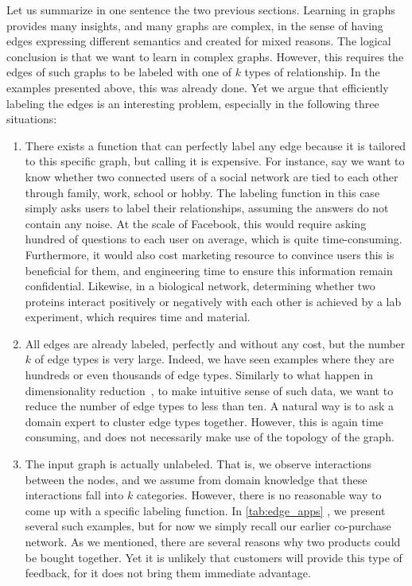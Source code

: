 Let us summarize in one sentence the two previous sections. Learning in graphs provides many
insights, and many graphs are complex, in the sense of having edges expressing different semantics
and created for mixed reasons. The logical conclusion is that we want to learn in complex graphs.
However, this requires the edges of such graphs to be labeled with one of $k$ types of relationship.
In the examples presented above, this was already done. Yet we argue that efficiently labeling the
edges is an interesting problem, especially in the following three situations:

\begin{enumerate}

  \item There exists a function that can perfectly label any edge because it is tailored to this
    specific graph, but calling it is expensive. For instance, say we want to know whether two
    connected users of a social network are tied to each other through family, work, school or
    hobby. The labeling function in this case simply asks users to label their relationships,
    assuming the answers do not contain any noise. At the scale of Facebook, this would require
    asking hundred of questions to each user on average, which is quite time-consuming. Furthermore,
    it would also cost marketing resource to convince users this is beneficial for them, and
    engineering time to ensure this information remain confidential. Likewise, in a biological
    network, determining whether two proteins interact positively or negatively with each other is
    achieved by a lab experiment, which requires time and material.

  \item All edges are already labeled, perfectly and without any cost, but the number $k$ of edge
    types is very large. Indeed, we have seen examples where they are hundreds or even thousands of
    edge types. Similarly to what happen in dimensionality
    reduction~\autocite{DimensionReduction10}, to make intuitive sense of such data, we want to
    reduce the number of edge types to less than ten. A natural way is to ask a domain expert to
    cluster edge types together. However, this is again time consuming, and does not necessarily
    make use of the topology of the graph.

  \item The input graph is actually unlabeled. That is, we observe interactions between the nodes,
    and we assume from domain knowledge that these interactions fall into $k$ categories. However,
    there is no reasonable way to come up with a specific labeling function. In
    \autoref{tab:edge_apps} , we present several such examples, but for now
    we simply recall our earlier co-purchase network. As we mentioned, there are several reasons why
    two products could be bought together. Yet it is unlikely that customers will provide this type
    of feedback, for it does not bring them immediate advantage.
\end{enumerate}

